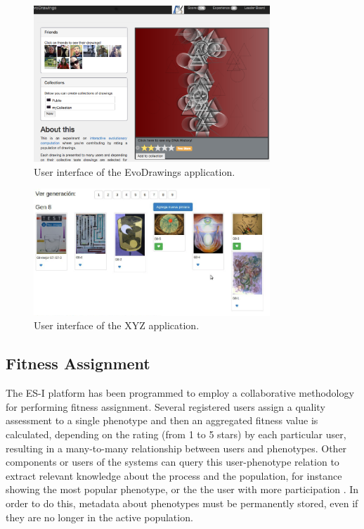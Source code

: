 \begin{figure}[!t]
    \centering
        \includegraphics[width=3.5in]{img/interface.png}
    \caption{User interface of the EvoDrawings application.}
    \label{fig:web}
\end{figure}

\label{sec:experiments}
\begin{figure}[!t]
    \centering
        \includegraphics[width=3.5in]{img/interfaceXYZ.png}
    \caption{User interface of the XYZ application.}
    \label{fig:xyz}
\end{figure}

\subsection{Fitness Assignment}
\label{sec:assignment}

The ES-I platform has been programmed to employ a 
collaborative methodology for performing fitness assignment. 
Several registered users assign a quality assessment to a single
phenotype and then an aggregated fitness value is calculated,
depending on the rating (from 1 to 5 stars) by each particular user,  
resulting in a many-to-many relationship between users and
phenotypes. Other components or users of the systems can 
query this user-phenotype relation to extract relevant
knowledge about the process and the population, for instance showing the
most popular phenotype, or the the user with more participation 
\cite{picbreeder}.
In order to do this, metadata about phenotypes 
must be permanently stored, even
if they are no longer in the active population. 

